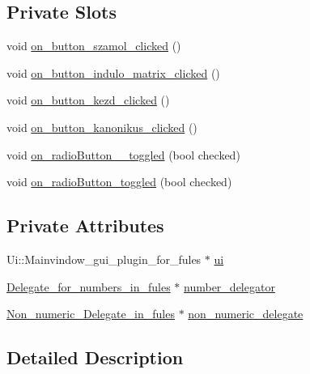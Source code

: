 \subsection*{Private Slots}
\begin{DoxyCompactItemize}
\item 
void \hyperlink{classMainvindow__gui__plugin__for__fules_ae30db934e0e08f96cebd31c051fc43c5}{on\+\_\+button\+\_\+szamol\+\_\+clicked} ()
\item 
void \hyperlink{classMainvindow__gui__plugin__for__fules_aea9911335d30ac911adf04aa5ccfd8ee}{on\+\_\+button\+\_\+indulo\+\_\+matrix\+\_\+clicked} ()
\item 
void \hyperlink{classMainvindow__gui__plugin__for__fules_ae833c3ac5845928744df35c255c80a76}{on\+\_\+button\+\_\+kezd\+\_\+clicked} ()
\item 
void \hyperlink{classMainvindow__gui__plugin__for__fules_adc6ad081195bda78f2d2c93736aba030}{on\+\_\+button\+\_\+kanonikus\+\_\+clicked} ()
\item 
void \hyperlink{classMainvindow__gui__plugin__for__fules_a40fb3f212d108731599d9a3e106ad65b}{on\+\_\+radio\+Button\+\_\+\_\+toggled} (bool checked)
\item 
void \hyperlink{classMainvindow__gui__plugin__for__fules_a8c33c824b142bea8995e3dd12f081f21}{on\+\_\+radio\+Button\+\_\+toggled} (bool checked)
\end{DoxyCompactItemize}
\subsection*{Private Attributes}
\begin{DoxyCompactItemize}
\item 
Ui\+::\+Mainvindow\+\_\+gui\+\_\+plugin\+\_\+for\+\_\+fules $\ast$ \hyperlink{classMainvindow__gui__plugin__for__fules_acdd8ed5ce96f1565bc722f1965faca67}{ui}
\item 
\hyperlink{classDelegate__for__numbers__in__fules}{Delegate\+\_\+for\+\_\+numbers\+\_\+in\+\_\+fules} $\ast$ \hyperlink{classMainvindow__gui__plugin__for__fules_a6b1f4a0fae34535113840411223ccfa6}{number\+\_\+delegator}
\item 
\hyperlink{classNon__numeric__Delegate__in__fules}{Non\+\_\+numeric\+\_\+\+Delegate\+\_\+in\+\_\+fules} $\ast$ \hyperlink{classMainvindow__gui__plugin__for__fules_aea0a3b7f00e651f970723dab3338240d}{non\+\_\+numeric\+\_\+delegate}
\end{DoxyCompactItemize}


\subsection{Detailed Description}


